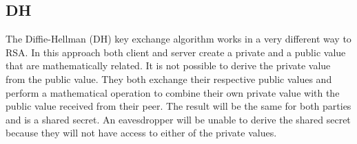 \subsection{DH}

The Diffie-Hellman (DH) key exchange algorithm works in a very different way to
RSA. In this approach both client and server create a private and a public
value that are mathematically related. It is not possible to derive the private
value from the public value. They both exchange their respective public values
and perform a mathematical operation to combine their own private value with
the public value received from their peer. The result will be the same for both
parties and is a shared secret. An eavesdropper will be unable to derive the
shared secret because they will not have access to either of the private
values.

